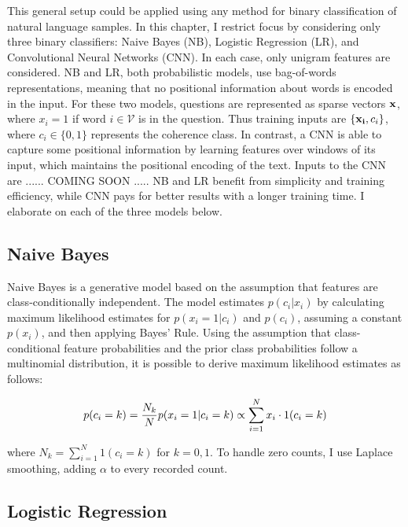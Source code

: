 This general setup could be applied using any method for binary classification of natural language samples. In this chapter, I restrict focus by considering only three binary classifiers: Naive Bayes (NB), Logistic Regression (LR), and Convolutional Neural Networks (CNN). In each case, only unigram features are considered. NB and LR, both probabilistic models, use bag-of-words representations, meaning that no positional information about words is encoded in the input. For these two models, questions are represented as sparse vectors $\bold{x}$, where $x_i = 1$ if word $i \in \mathcal{V}$ is in the question. Thus training inputs are $\{\bold{x_i}, c_i\}$, where $c_i \in \{0, 1\}$ represents the coherence class. In contrast, a CNN is able to capture some positional information by learning features over windows of its input, which maintains the positional encoding of the text. Inputs to the CNN are ...... COMING SOON ..... NB and LR benefit from simplicity and training efficiency, while CNN pays for better results with a longer training time. I elaborate on each of the three models below.

\subsection{Naive Bayes}

Naive Bayes is a generative model based on the assumption that features are class-conditionally independent. The model estimates $p(c_i | x_i)$ by calculating maximum likelihood estimates for $p(x_i = 1 | c_i)$ and $p(c_i)$, assuming a constant $p(x_i)$, and then applying Bayes' Rule. Using the assumption that class-conditional feature probabilities and the prior class probabilities follow a multinomial distribution, it is possible to derive maximum likelihood estimates as follows:
\begin{center}
\begin{equation}
p(c_i = k) = \frac{N_k}{N}  \\
p(x_i = 1 | c_i = k) \propto \sum_{i=1}^N x_i\cdot 1(c_i = k)
\end{equation}
\end{center}
where $N_k = \sum_{i=1}^N 1(c_i = k)$ for $k = 0, 1$. To handle zero counts, I use Laplace smoothing, adding $\alpha$ to every recorded count.

\subsection{Logistic Regression}

